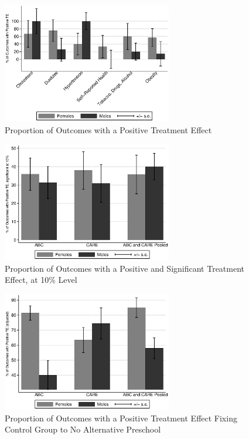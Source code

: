 \documentclass[static]{JJH-Beamer}
\begin{document}
\begin{frame}
\begin{figure}
\caption{Proportion of Outcomes with a Positive Treatment Effect}
	\includegraphics[width=20em]{output/itt_noctrl_cats2.eps}
\end{figure}
\end{frame}


\begin{frame}
\begin{figure}
\caption{Proportion of Outcomes with a Positive and Significant Treatment Effect, at 10\% Level}
	\includegraphics[width=20em]{output/itt_noctrl_all_sig10.eps}
\end{figure}
\end{frame}


\begin{frame}\label{epan_ipw_p0_all}
\begin{figure}
\caption{Proportion of Outcomes with a Positive Treatment Effect Fixing Control Group to No Alternative Preschool}
	\includegraphics[width=20em]{output/epan_ipw_p0_all.eps}
\end{figure}
\end{frame}
\end{document}
